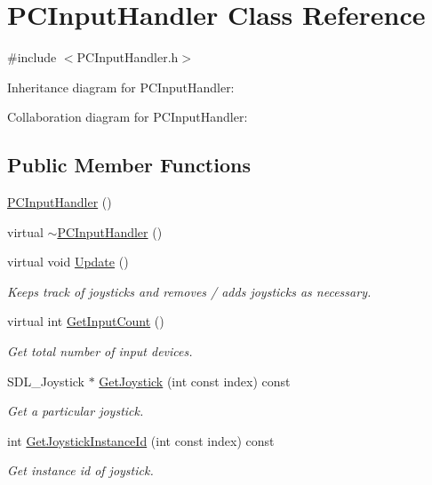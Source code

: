 \hypertarget{classPCInputHandler}{}\section{P\+C\+Input\+Handler Class Reference}
\label{classPCInputHandler}


{\ttfamily \#include $<$P\+C\+Input\+Handler.\+h$>$}



Inheritance diagram for P\+C\+Input\+Handler\+:


Collaboration diagram for P\+C\+Input\+Handler\+:
\subsection*{Public Member Functions}
\begin{DoxyCompactItemize}
\item 
\hyperlink{classPCInputHandler_ae97120877ff79d0ffd46eb7b97f9edb8}{P\+C\+Input\+Handler} ()
\item 
virtual \hyperlink{classPCInputHandler_a9b9f9bada5963ee7a1ee4d001acc66d7}{$\sim$\+P\+C\+Input\+Handler} ()
\item 
virtual void \hyperlink{classPCInputHandler_a9c525f21b121c85e9837b54b9815a006}{Update} ()
\begin{DoxyCompactList}\small\item\em Keeps track of joysticks and removes / adds joysticks as necessary. \end{DoxyCompactList}\item 
virtual int \hyperlink{classPCInputHandler_aca8209c707702eb2a867d6b3e1e21d5e}{Get\+Input\+Count} ()
\begin{DoxyCompactList}\small\item\em Get total number of input devices. \end{DoxyCompactList}\item 
S\+D\+L\+\_\+\+Joystick $\ast$ \hyperlink{classPCInputHandler_a9a6ee8b3507c63c25bc50db724ea30a8}{Get\+Joystick} (int const index) const 
\begin{DoxyCompactList}\small\item\em Get a particular joystick. \end{DoxyCompactList}\item 
int \hyperlink{classPCInputHandler_a91f575a558208e1a136e33ba7ed9427b}{Get\+Joystick\+Instance\+Id} (int const index) const 
\begin{DoxyCompactList}\small\item\em Get instance id of joystick. \end{DoxyCompactList}\end{DoxyCompactItemize}
